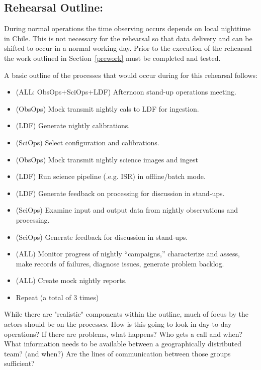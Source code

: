 \subsection{Rehearsal Outline:}
During normal operations the time observing occurs depends on local nighttime
in Chile.  This is not necessary for the rehearsal so that data delivery and
can be shifted to occur in a normal working day.  Prior to the execution of 
the rehearsal the work outlined in Section~\ref{prework} must be completed
and tested.

A basic outline of the processes that would occur during for this rehearsal 
follows:
\begin{itemize}[topsep=-8pt]
\item (ALL: ObsOps+SciOps+LDF) Afternoon stand-up operations meeting.
\item (ObsOps) Mock transmit nightly cals to LDF for ingestion.
\item (LDF) Generate nightly calibrations.
\item (SciOps) Select configuration and calibrations.
\item (ObsOps) Mock transmit nightly science images and ingest
\item (LDF) Run science pipeline (.e.g. ISR) in offline/batch mode.
\item (LDF) Generate feedback on processing for discussion in stand-ups.
\item (SciOps) Examine input and output data from nightly observations and
processing.
\item (SciOps) Generate feedback for discussion in stand-ups.
\item (ALL) Monitor progress of nightly “campaigns,” characterize and assess, 
make records of failures, diagnose issues, generate problem backlog.
\item (ALL) Create mock nightly reports.
\item Repeat (a total of 3 times)
\end{itemize}

While there are "realistic" components within the outline, much of focus by 
the actors should be on the processes.  How is this going to look in 
day-to-day operations?  If there are problems, what happens?  Who gets a 
call and when?  What information needs to be available between a geographically
distributed team? (and when?)  Are the lines of communication between those
groups sufficient?


